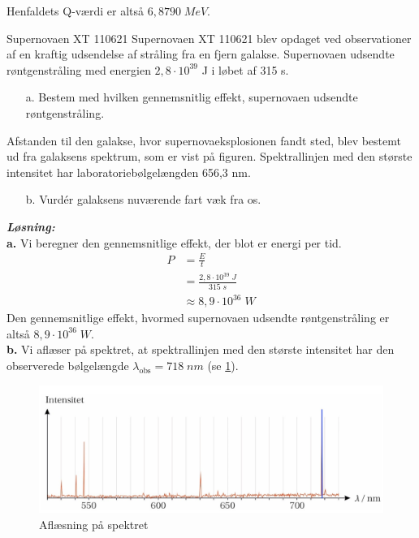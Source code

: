 \documentclass{report}
\newcommand{\sol}{\setlength{\parindent}{0cm}\textbf{\textit{Løsning:}}\setlength{\parindent}{1cm}}
\begin{document}
Henfaldets Q-værdi er altså $6,8790 \;\unit{MeV} $.
\begin{question}{Supernovaen XT 110621}{}
  Supernovaen XT 110621 blev opdaget ved observationer af en kraftig udsendelse af stråling fra en fjern galakse. Supernovaen udsendte røntgenstråling med energien $2,8 \cdot 10^{39}$ J i løbet af 315 s.
\begin{itemize}
  \item[a.] Bestem med hvilken gennemsnitlig effekt, supernovaen udsendte røntgenstråling.
\end{itemize}
Afstanden til den galakse, hvor supernovaeksplosionen fandt sted, blev bestemt ud fra galaksens spektrum, som er vist på figuren. Spektrallinjen med den største intensitet har laboratoriebølgelængden 656,3 nm. 
\begin{itemize}
  \item[b.] Vurdér galaksens nuværende fart væk fra os.
\end{itemize}
\end{question}
\sol \\
\textbf{a.}
Vi beregner den gennemsnitlige effekt, der blot er energi per tid.
\begin{equation*}
\begin{split}
  P&=\frac{E}{t}\\
  &=\frac{2,8 \cdot 10 ^{39} \;\unit{J} }{315 \;\unit{s} }\\
  &\approx 8,9 \cdot 10 ^{36} \;\unit{W}
\end{split}
\end{equation*}
Den gennemsnitlige effekt, hvormed supernovaen udsendte røntgenstråling er altså $8,9 \cdot 10 ^{36} \;\unit{W} $.\\[1ex]
\textbf{b.}
Vi aflæser på spektret, at spektrallinjen med den største intensitet har den observerede bølgelængde $\lambda _{\text{obs} }=718 \;\unit{nm} $ (se \cref{fig:spek}).
\begin{figure}[H]
\begin{center}
  \includegraphics[width=\textwidth]{spek.png}
\end{center}
\caption{Aflæsning på spektret}
\label{fig:spek}
\end{figure}
\end{document}
